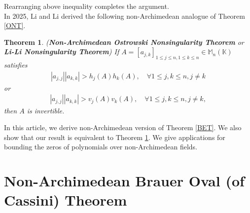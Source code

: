 \documentclass{amsart}
\newtheorem{theorem}{Theorem}[section]
\begin{document}
Rearranging above inequality completes the argument. \\
In 2025, Li and Li derived the following non-Archimedean analogue of Theorem  \ref{ONT}.
\begin{theorem} \cite{LILI} \label{LLT}
	(\textbf{Non-Archimedean Ostrowski Nonsingularity Theorem} or \textbf{Li-Li Nonsingularity Theorem})
	If  $A=[a_{j,k}]_{1\leq j\leq n, 1\leq k \leq n}\in  \mathbb{M}_n(\mathbb{K})$ satisfies
	\begin{align*}
		|a_{j,j}||a_{k,k}|>h_j(A)h_k(A), \quad \forall 1\leq j, k \leq n, j \neq k
	\end{align*}
	or 
	\begin{align*}
		|a_{j,j}||a_{k,k}|>v_j(A)v_k(A), \quad \forall 1\leq j, k \leq n, j \neq k,
	\end{align*}
	then $A$ is invertible. 	
\end{theorem}
In this article, we derive non-Archimedean version of Theorem \ref{BET}. We also show that our result is equivalent to Theorem \ref{LLT}. We give applications for bounding the zeros of polynomials over non-Archimedean fields. 





\section{Non-Archimedean Brauer Oval (of Cassini)  Theorem}
\end{document}
